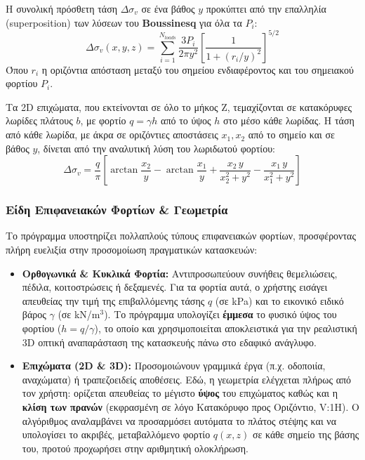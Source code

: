 \documentclass[11pt,a4paper]{article}
\begin{document}
Η συνολική πρόσθετη τάση $\Delta\sigma_v$ σε ένα βάθος $y$ προκύπτει από την επαλληλία (superposition) των λύσεων του \textbf{Boussinesq} για όλα τα $P_i$:
\begin{equation}
  \Delta\sigma_v(x,y,z) = \sum_{i=1}^{N_{loads}} \frac{3P_i}{2\pi y^2}\left[\frac{1}{1+(r_i/y)^2}\right]^{5/2}
\end{equation}
Όπου $r_i$ η οριζόντια απόσταση μεταξύ του σημείου ενδιαφέροντος και του σημειακού φορτίου $P_i$.

Τα 2D επιχώματα, που εκτείνονται σε όλο το μήκος Z, τεμαχίζονται σε κατακόρυφες λωρίδες πλάτους $b$, με φορτίο $q = \gamma h$ από το ύψος $h$ στο μέσο κάθε λωρίδας. Η τάση από κάθε λωρίδα, με άκρα σε οριζόντιες αποστάσεις $x_1, x_2$ από το σημείο και σε βάθος $y$, δίνεται από την αναλυτική λύση του λωριδωτού φορτίου:
\begin{equation}
  \Delta\sigma_v = \frac{q}{\pi}\left[\arctan\frac{x_2}{y} - \arctan\frac{x_1}{y} + \frac{x_2\,y}{x_2^2+y^2} - \frac{x_1\,y}{x_1^2+y^2}\right]
\end{equation}

\subsubsection{Είδη Επιφανειακών Φορτίων \& Γεωμετρία}

Το πρόγραμμα υποστηρίζει πολλαπλούς τύπους επιφανειακών φορτίων, προσφέροντας πλήρη ευελιξία στην προσομοίωση πραγματικών κατασκευών:
\begin{itemize}
  \item \textbf{Ορθογωνικά \& Κυκλικά Φορτία:} Αντιπροσωπεύουν συνήθεις θεμελιώσεις, πέδιλα, κοιτοστρώσεις ή δεξαμενές. Για τα φορτία αυτά, ο χρήστης εισάγει απευθείας την τιμή της επιβαλλόμενης τάσης $q$ (σε kPa) και το εικονικό ειδικό βάρος $\gamma$ (σε kN/m$^3$). Το πρόγραμμα υπολογίζει \textbf{έμμεσα} το φυσικό ύψος του φορτίου ($h = q/\gamma$), το οποίο και χρησιμοποιείται αποκλειστικά για την ρεαλιστική 3D οπτική αναπαράσταση της κατασκευής πάνω στο εδαφικό ανάγλυφο.
  \item \textbf{Επιχώματα (2D \& 3D):} Προσομοιώνουν γραμμικά έργα (π.χ. οδοποιία, αναχώματα) ή τραπεζοειδείς αποθέσεις. Εδώ, η γεωμετρία ελέγχεται πλήρως από τον χρήστη: ορίζεται απευθείας το μέγιστο \textbf{ύψος} του επιχώματος καθώς και η \textbf{κλίση των πρανών} (εκφρασμένη σε λόγο Κατακόρυφο προς Οριζόντιο, V:1H). Ο αλγόριθμος αναλαμβάνει να προσαρμόσει αυτόματα το πλάτος στέψης και να υπολογίσει το ακριβές, μεταβαλλόμενο φορτίο $q(x,z)$ σε κάθε σημείο της βάσης του, προτού προχωρήσει στην αριθμητική ολοκλήρωση.
\end{itemize}
\end{document}
